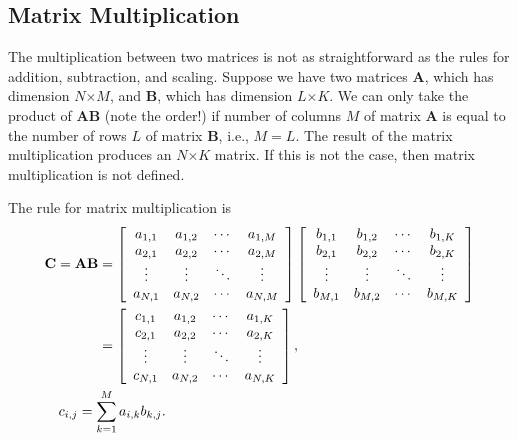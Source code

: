 \subsection{Matrix Multiplication}

The multiplication between two matrices is not as straightforward as the rules for addition, subtraction, and scaling. Suppose we have two matrices $\mathbf{A}$, which has dimension $N$$\times$$M$, and $\mathbf{B}$, which has dimension $L$$\times$$K$. We can only take the product of $\mathbf{AB}$ (note the order!) if number of columns $M$ of matrix $\mathbf{A}$ is equal to the number of rows $L$ of matrix $\mathbf{B}$, i.e., $M = L$. The result of the matrix multiplication produces an $N$$\times$$K$ matrix. If this is not the case, then matrix multiplication is not defined.

The rule for matrix multiplication is
\begin{align}
  \mathbf{C} = \mathbf{AB} &=
  \left[ \begin{array}{c c c c} a_{1,1} & a_{1,2} & \cdots & a_{1,M} \\
  								a_{2,1} & a_{2,2} & \cdots & a_{2,M} \\
								\vdots  & \vdots  & \ddots & \vdots  \\
								a_{N,1} & a_{N,2} & \cdots & a_{N,M} \\ \end{array} \right]
  \left[ \begin{array}{c c c c} b_{1,1} & b_{1,2} & \cdots & b_{1,K} \\
  								b_{2,1} & b_{2,2} & \cdots & b_{2,K} \\
								\vdots  & \vdots  & \ddots & \vdots  \\
								b_{M,1} & b_{M,2} & \cdots & b_{M,K} \\ \end{array} \right] \nonumber \\
  &= \left[ \begin{array}{c c c c} c_{1,1} & a_{1,2} & \cdots & a_{1,K} \\
  								   c_{2,1} & a_{2,2} & \cdots & a_{2,K} \\
								  \vdots  & \vdots  & \ddots & \vdots  \\
								   c_{N,1} & a_{N,2} & \cdots & a_{N,K} \\ \end{array} \right] , \nonumber \\
  &\hspace{-1cm} c_{i,j} = \sum_{k=1}^M a_{i,k} b_{k,j}.
\end{align}

